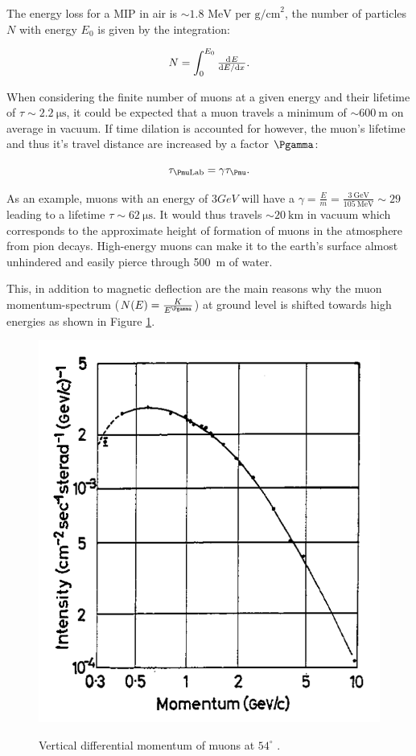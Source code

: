 The energy loss for a MIP in air is $\sim 1.8 \text{ MeV per g/cm}^2$, the number of particles $N$ with energy $E_0$ is given by the integration:

\begin{equation}
N=\int_0^{E_0}\od{E}{E/\text{d}x}.
\end{equation}


When considering the finite number of muons at a given energy and their lifetime of $\tau\sim\SI{2.2}{\micro\second}$, it could be expected that a muon travels a minimum of $\sim \SI{600}{\meter}$ on average in vacuum. If time dilation is accounted for however, the muon's lifetime and thus it's travel distance are increased by a factor $\Pgamma$:

\begin{equation}
\tau_{\Pmu\text{Lab}}=\gamma\tau_{\Pmu}.
\end{equation}

As an example, muons with an energy of $3 GeV$ will have a $\gamma=\frac{E}{m}=\frac{\SI{3}{\GeV}}{\SI{105}{\MeV}}\sim 29$ leading to a lifetime $\tau \sim \SI{62}{\micro\second}$. It would thus travels $\sim \SI{20}{\kilo\meter}$ in vacuum which corresponds to the approximate height of formation of muons in the atmosphere from pion decays. High-energy muons can make it to the earth's surface almost unhindered and easily pierce through \SI{500}{\meter} of water.

This, in addition to magnetic deflection are the main reasons why the muon momentum-spectrum ($N(E)=\frac{K}{E^{\Pgamma}}$) at ground level is shifted towards high energies as shown in Figure \ref{fig:shift}.

\begin{figure}[htbp]
\centering
\includegraphics[width=0.5\linewidth]{./fig/shiftDur.png}
\label{fig:shift}
\caption{Vertical differential momentum of muons at $54^\circ$ \cite{Gardener_1962}.}
\end{figure}


